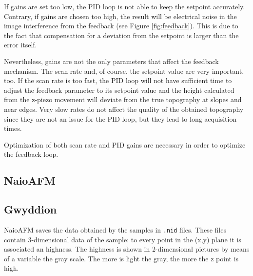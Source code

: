\documentclass[11pt,a4paper]{article}
\begin{document}
If gains are set too low, the PID loop is not able to keep the setpoint accurately. Contrary, if gains are chosen too high, the result will be electrical noise in the image interference from the feedback (see Figure \ref{fig:feedback}). This is due to the fact that compensation for a deviation from the setpoint is larger than the error itself.

Nevertheless, gains are not the only parameters that affect the feedback mechanism. The scan rate and, of course, the setpoint value are very important, too. If the scan rate is too fast, the PID loop will not have sufficient time to adjust the feedback parameter to its setpoint value and the height calculated from the z-piezo movement will deviate from the true topography at slopes and near edges. Very slow rates do not affect the quality of the obtained topography since they are not an issue for the PID loop, but they lead to long acquisition times.

Optimization of both scan rate and PID gains are necessary in order to optimize the feedback loop.

\subsection{NaioAFM}

\subsection{Gwyddion}
NaioAFM saves the data obtained by the samples in \texttt{.nid} files. These files contain 3-dimensional data of the sample: to every point in the (x,y) plane it is associated an highness. The highness is shown in 2-dimensional pictures by means of a variable the gray scale. The more is light the gray, the more the z point is high.
\end{document}
